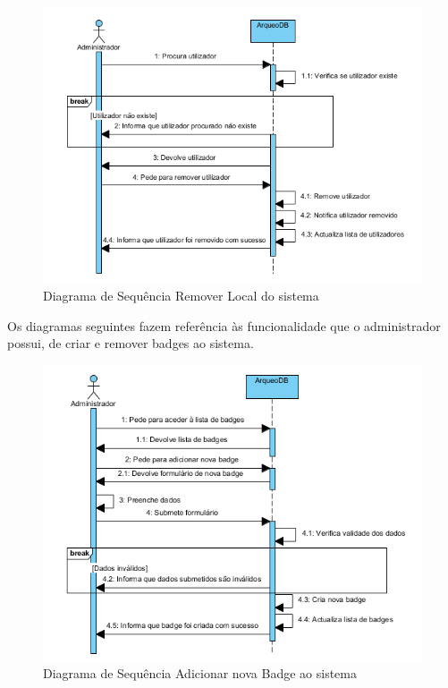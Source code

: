 \documentclass[12pt,a4paper]{article}
\begin{document}
\begin{figure}[h!]
\centering
\includegraphics[scale=1]{sequencia/A_removerlocal}
\caption{Diagrama de Sequência Remover Local do sistema} 
\end{figure}

\clearpage
Os diagramas seguintes fazem referência às funcionalidade que o administrador possui, de criar e remover badges ao sistema.\\

\begin{figure}[h!]
\centering
\includegraphics[scale=1]{sequencia/A_criarbadge}
\caption{Diagrama de Sequência Adicionar nova Badge ao sistema} 
\end{figure}  
\end{document}
